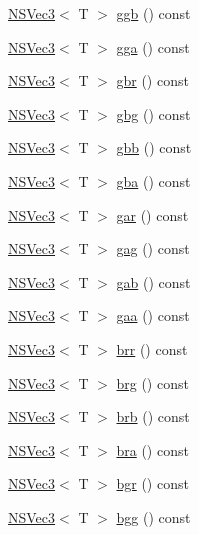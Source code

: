 \begin{DoxyCompactItemize}
\item 
\hyperlink{structNSVec3}{N\-S\-Vec3}$<$ T $>$ \hyperlink{structNSVec4_a6d01f26179cfa1be1b4f0979798bcf36}{ggb} () const 
\item 
\hyperlink{structNSVec3}{N\-S\-Vec3}$<$ T $>$ \hyperlink{structNSVec4_af5f52afea3aaa8750f442fb468dccfce}{gga} () const 
\item 
\hyperlink{structNSVec3}{N\-S\-Vec3}$<$ T $>$ \hyperlink{structNSVec4_a4743017e49f4ed847c22e1482f7dd4ec}{gbr} () const 
\item 
\hyperlink{structNSVec3}{N\-S\-Vec3}$<$ T $>$ \hyperlink{structNSVec4_ae4b91b4c8e4405dcb47a4dea58b7326f}{gbg} () const 
\item 
\hyperlink{structNSVec3}{N\-S\-Vec3}$<$ T $>$ \hyperlink{structNSVec4_ab0fad37165ac3287b3af364f113111e5}{gbb} () const 
\item 
\hyperlink{structNSVec3}{N\-S\-Vec3}$<$ T $>$ \hyperlink{structNSVec4_a69233c7963154bc7f1535ffa4cb0b0cc}{gba} () const 
\item 
\hyperlink{structNSVec3}{N\-S\-Vec3}$<$ T $>$ \hyperlink{structNSVec4_a4d0e8864809df13ae99fa08996a81502}{gar} () const 
\item 
\hyperlink{structNSVec3}{N\-S\-Vec3}$<$ T $>$ \hyperlink{structNSVec4_a06521e706ab3fe65fa2c55587ef31558}{gag} () const 
\item 
\hyperlink{structNSVec3}{N\-S\-Vec3}$<$ T $>$ \hyperlink{structNSVec4_a72d090349759493c233589774dd5208c}{gab} () const 
\item 
\hyperlink{structNSVec3}{N\-S\-Vec3}$<$ T $>$ \hyperlink{structNSVec4_a78612b9abfda9208157a8ccf69d5b08c}{gaa} () const 
\item 
\hyperlink{structNSVec3}{N\-S\-Vec3}$<$ T $>$ \hyperlink{structNSVec4_a77c141ebfb21c970154ee692491562b3}{brr} () const 
\item 
\hyperlink{structNSVec3}{N\-S\-Vec3}$<$ T $>$ \hyperlink{structNSVec4_a19f3a085d71b8999edfcab7b47e1d880}{brg} () const 
\item 
\hyperlink{structNSVec3}{N\-S\-Vec3}$<$ T $>$ \hyperlink{structNSVec4_ac193aa4ba64d8f6caeedab71b83e48aa}{brb} () const 
\item 
\hyperlink{structNSVec3}{N\-S\-Vec3}$<$ T $>$ \hyperlink{structNSVec4_a0ed938b3df2626d00e563894d08600c0}{bra} () const 
\item 
\hyperlink{structNSVec3}{N\-S\-Vec3}$<$ T $>$ \hyperlink{structNSVec4_a05de060b4c133db8b6906099c0df0508}{bgr} () const 
\item 
\hyperlink{structNSVec3}{N\-S\-Vec3}$<$ T $>$ \hyperlink{structNSVec4_a1bb75363c391619e5610455fdc06947b}{bgg} () const 

\end{DoxyCompactItemize}

